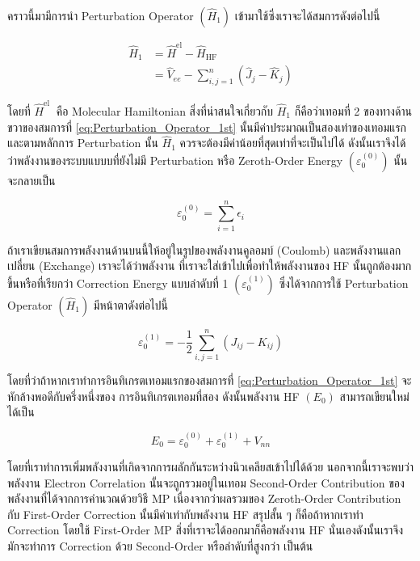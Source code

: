 คราวนี้มามีการนำ Perturbation Operator $(\hat{H}_1)$ เข้ามาใช้ซึ่งเราจะได้สมการดังต่อไปนี้

\begin{equation}
  \label{eq:Perturbation_Operator_1st}
  \begin{aligned}
    \hat{H}_1
     & = \hat{H}^{\mathrm{el}} - \hat{H}_{\mathrm{HF}} \\
     & = \hat{V}_{e e} - \sum_{i, j=1}^n
    \left(
    \hat{J}_j - \hat{K}_j
    \right)
  \end{aligned}
\end{equation}

\noindent โดยที่ $\hat{H}^{\text{el }}$ คือ Molecular Hamiltonian สิ่งที่น่าสนใจเกี่ยวกับ $\hat{H}_1$
ก็คือว่าเทอมที่ 2 ของทางด้านขวาของสมการที่ \eqref{eq:Perturbation_Operator_1st} นั้นมีค่าประมาณเป็นสองเท่าของเทอมแรกและตามหลักการ
Perturbation นั้น $\hat{H}_1$ ควรจะต้องมีค่าน้อยที่สุดเท่าที่จะเป็นไปได้ ดังนั้นเราจึงได้ว่าพลังงานของระบบแบบบที่ยังไม่มี
Perturbation หรือ Zeroth-Order Energy $(\varepsilon_{0}^{(0)})$ นั้นจะกลายเป็น

\begin{equation}
  \varepsilon_{0}^{(0)} = \sum_{i=1}^{n} \epsilon_{i}
\end{equation}

\noindent ถ้าเราเขียนสมการพลังงานด้านบนนี้ให้อยู่ในรูปของพลังงานคูลอมบ์ (Coulomb) และพลังงานแลกเปลี่ยน (Exchange) เราจะได้ว่าพลังงาน%
ที่เราจะใส่เข้าไปเพื่อทำให้พลังงานของ HF นั้นถูกต้องมากขึ้นหรือที่เรียกว่า Correction Energy แบบลำดับที่ 1 $(\varepsilon_{0}^{(1)})$
ซึ่งได้จากการใช้ Perturbation Operator $(\hat{H}_1)$ มีหน้าตาดังต่อไปนี้

\begin{equation}
  \varepsilon_{0}^{(1)}
  =
  - \frac{1}{2} \sum_{i, j=1}^{n}
  \left(
  J_{i j}-K_{i j}
  \right)
\end{equation}

\noindent โดยที่ว่าถ้าหากเราทำการอินทิเกรตเทอมแรกของสมการที่ \eqref{eq:Perturbation_Operator_1st} จะหักล้างพอดีกับครึ่งหนึ่งของ%
การอินทิเกรตเทอมที่สอง ดังนั้นพลังงาน HF $(E_{0})$ สามารถเขียนใหม่ได้เป็น

\begin{equation}
  E_{0}
  =
  \varepsilon_{0}^{(0)}+\varepsilon_{0}^{(1)}+V_{n n}
\end{equation}

\noindent โดยที่เราทำการเพิ่มพลังงานที่เกิดจากการผลักกันระหว่างนิวเคลียสเข้าไปได้ด้วย นอกจากนี้เราจะพบว่าพลังงาน Electron Correlation
นั้นจะถูกรวมอยู่ในเทอม Second-Order Contribution ของพลังงานที่ได้จากการคำนวณด้วยวิธี MP เนื่องจากว่าผลรวมของ Zeroth-Order
Contribution กับ First-Order Correction นั้นมีค่าเท่ากับพลังงาน HF สรุปสั้น ๆ ก็คือถ้าหากเราทำ Correction โดยใช้ First-Order
MP สิ่งที่เราจะได้ออกมาก็คือพลังงาน HF นั่นเองดังนั้นเราจึงมักจะทำการ Correction ด้วย Second-Order หรือลำดับที่สูงกว่า เป็นต้น

